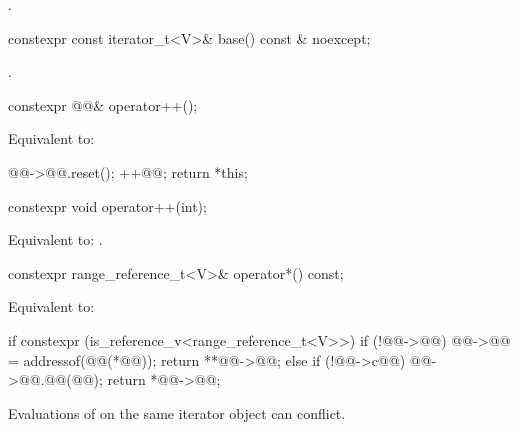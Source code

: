 \begin{itemdescr}
\pnum
\returns
{}.
\end{itemdescr}

%
\begin{itemdecl}
constexpr const iterator_t<V>& base() const & noexcept;
\end{itemdecl}

\begin{itemdescr}
\pnum
\returns
{}.
\end{itemdescr}

%
\begin{itemdecl}
constexpr @@& operator++();
\end{itemdecl}

\begin{itemdescr}
\pnum
\effects
Equivalent to:
\begin{codeblock}
@@->@@.reset();
++@@;
return *this;
\end{codeblock}
\end{itemdescr}

%
\begin{itemdecl}
constexpr void operator++(int);
\end{itemdecl}

\begin{itemdescr}
\pnum
\effects
Equivalent to: .
\end{itemdescr}

%
\begin{itemdecl}
constexpr range_reference_t<V>& operator*() const;
\end{itemdecl}

\begin{itemdescr}
\pnum
\effects
Equivalent to:
\begin{codeblock}
if constexpr (is_reference_v<range_reference_t<V>>) {
  if (!@@->@@) {
    @@->@@ = addressof(@@(*@@));
  }
  return **@@->@@;
} else {
  if (!@@->c@@) {
    @@->@@.@@(@@);
  }
  return *@@->@@;
}
\end{codeblock}
\begin{note}
Evaluations of  on the same iterator object
can conflict.
\end{note}
\end{itemdescr}

